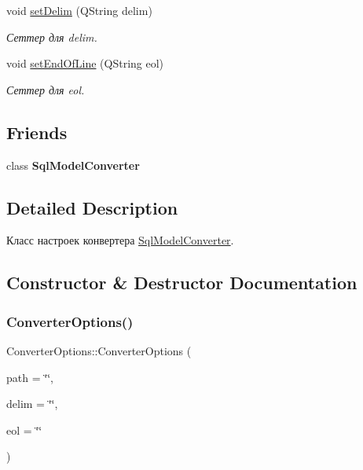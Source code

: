 \begin{DoxyCompactItemize}
void \mbox{\hyperlink{class_converter_options_a5fa443d5b4b85ae865df5e7e242427d9}{set\+Delim}} (Q\+String delim)
\begin{DoxyCompactList}\small\item\em Сеттер для delim. \end{DoxyCompactList}\item 
void \mbox{\hyperlink{class_converter_options_ad536240705b539c58323240ca5bc1f5c}{set\+End\+Of\+Line}} (Q\+String eol)
\begin{DoxyCompactList}\small\item\em Сеттер для eol. \end{DoxyCompactList}\end{DoxyCompactItemize}
\subsection*{Friends}
\begin{DoxyCompactItemize}
\item 
\mbox{\label{class_converter_options_ac2834b7186dba9c25da67cb842f271f1}} 
class {\bfseries Sql\+Model\+Converter}
\end{DoxyCompactItemize}


\subsection{Detailed Description}
Класс настроек конвертера \mbox{\hyperlink{class_sql_model_converter}{Sql\+Model\+Converter}}. 

\subsection{Constructor \& Destructor Documentation}
\mbox{\label{class_converter_options_a99308bb0a82b2f0436a7236ffe1248b0}} 
\subsubsection{\texorpdfstring{Converter\+Options()}{ConverterOptions()}}
{\footnotesize\ttfamily Converter\+Options\+::\+Converter\+Options (\begin{DoxyParamCaption}\item[{Q\+String}]{path = {\ttfamily \char`\"{}\char`\"{}},  }\item[{Q\+String}]{delim = {\ttfamily \char`\"{}\char`\"{}},  }\item[{Q\+String}]{eol = {\ttfamily \char`\"{}\char`\"{}} }\end{DoxyParamCaption})\hspace{0.3cm}{\ttfamily [inline]}}



